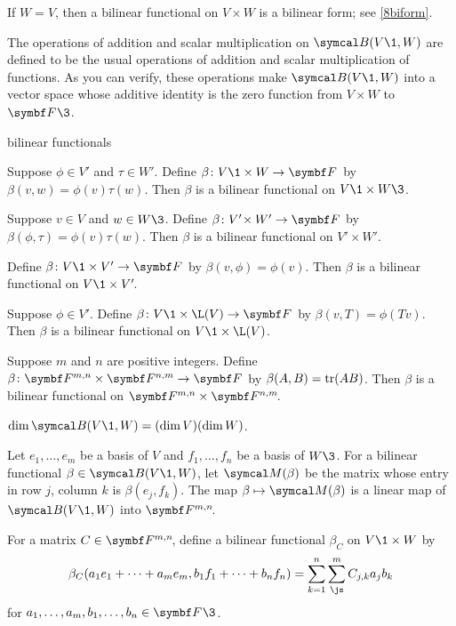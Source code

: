 If $W = V$, then a bilinear functional on $V \times W$ is a bilinear form; see \ref{8biform}.

The operations of addition and scalar multiplication on $\B(V\1, W)$ are defined to be the usual operations of addition and scalar multiplication of functions. As you can verify, these operations make $\B(V\1,W)$ into a vector space whose additive identity is the zero function from $V \times W$ to $\F{}\3$.

\begin{example}{bilinear functionals}
\begin{Itemize}
\item
Suppose $\phi \in V'$ and $\tau \in W'\!$. Define $\fun \beta {V\1 \times W} {\F{}}$ by $\beta(v, w) = \phi(v) \tau(w)$. Then $\beta$ is a bilinear functional on $V\1 \times W\3$.

\item
Suppose $v \in V$ and $w \in W\3$. Define $\fun \beta {V'\! \times W'} {\F{}}$ by $\beta(\phi, \tau) = \phi(v) \tau(w)$. Then $\beta$ is a bilinear functional on $V'\! \times W'\!$.

\item
Define $\fun \beta {V\1 \times V'} {\F{}}$ by $\beta(v, \phi) = \phi(v)$. Then $\beta$ is a bilinear functional on $V\1 \times V'\!$.

\item
Suppose $\phi \in V'\!$. Define $\fun \beta {V\1 \times \L(V)} {\F{}}$ by $\beta(v, T) = \phi(Tv)$. Then $\beta$ is a bilinear functional on
$V\1 \times \L(V)$.

\item
Suppose $m$ and $n$ are positive integers. Define $\fun \beta { \F{m, n} \times \F{n,m} } {\F{}}$ by
$\beta(A, B) = \operatorname{tr}(AB)$. Then $\beta$ is a bilinear functional on $\F{m, n} \times \F{n,m}\!$.
\end{Itemize}
\exampleitemend
\end{example}

{$\dim \B(V\1,W) = (\dim V)(\dim W)$.}

\proof
Let $e_1, \ldots, e_m$ be a basis of $V$ and $f_1, \ldots, f_n$ be a basis of $W\3$. For a bilinear functional $\beta \in \B(V\1,W)$, let $\M(\beta)$ be the  matrix whose entry in row $j$, column $k$ is $\beta(e_j, f_k)$.
The map $\beta \mapsto \M(\beta)$ is a linear map of $\B(V\1,W)$ into $\FF{m,n}$.

For a matrix $C \in \FF{m,n}$, define a bilinear functional $\beta_C$ on $V\1 \times W$ by
\[
\beta_C( a_1 e_1+ \cdots + a_m e_m, b_1 f_1 + \cdots + b_n f_n ) = \sum_{k=1}^n \sum_{\js}^m C_{j,k} a_j b_k
\]
for $a_1, \ldots, a_m, b_1, \ldots, b_n \in \F{}\3$.


